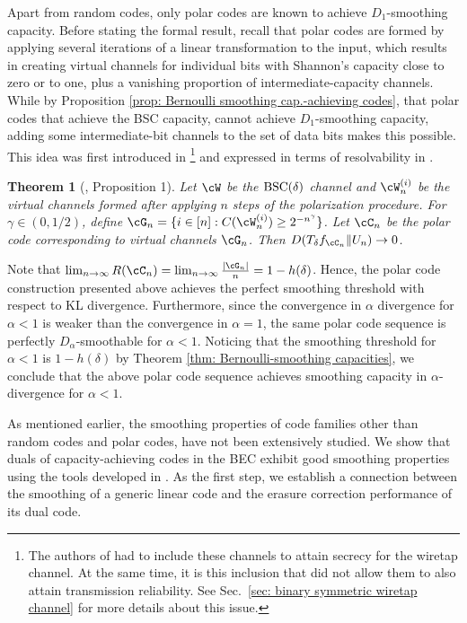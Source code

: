 \documentclass{amsart}
\newtheorem{theorem}{Theorem}[section]
\theoremstyle{remark}
\begin{document}
Apart from random codes, only polar codes are known to achieve $D_1$-smoothing capacity. Before stating the formal result, recall that polar codes are formed by applying several iterations of a linear transformation to the input, which results in creating virtual channels for individual bits with Shannon's capacity close to zero or to one, plus a vanishing proportion of intermediate-capacity channels. While by Proposition \ref{prop: Bernoulli smoothing cap.-achieving codes}, that polar codes that achieve the BSC capacity, cannot achieve $D_1$-smoothing capacity, adding some intermediate-bit channels to the 
set of data bits makes this possible. This idea was first introduced in \cite{mahdavifar2011achieving}\footnote{
\label{fn:MV} The authors of \cite{mahdavifar2011achieving} had to include these channels to attain secrecy for the wiretap channel. At the same time, it is this inclusion that did not allow them to also attain transmission reliability. See Sec.~\ref{sec: binary symmetric wiretap  channel} for more details about this issue.} and expressed in terms of resolvability in \cite{bloch2012strong}.

\begin{theorem} [\cite{bloch2012strong}, Proposition 1]\label{thm: Bernoulli smoothing polar codes}
Let $\cW$ be the ${\text{\rm BSC}}(\delta)$ channel and $\cW_n^{(i)}$  be the virtual channels formed after applying $n$ steps of the polarization procedure. 
For $\gamma \in (0,1/2)$, define $\cG_n = \{i \in [n]: C(\cW_n^{(i)}) \geq 2^{-n^\gamma}\}$. Let $\cC_n$ be the polar code corresponding to virtual channels $\cG_n$. Then $D(T_{\delta}f_{\cC_n}\|U_n) \to 0$.
\end{theorem}

 Note that $\lim_{n\to\infty}R(\cC_n) =  \lim_{n\to\infty}\frac{|\cG_n|}{n} = 1-h(\delta)$. Hence, the polar code construction presented above achieves the perfect smoothing threshold with respect to KL divergence. Furthermore, since the convergence in $\alpha$ divergence for $\alpha<1$ is weaker than the convergence in $\alpha =1$, the same polar code sequence is perfectly $D_{\alpha}$-smoothable for $\alpha<1$. Noticing that the smoothing threshold for $\alpha<1$ is $1-h(\delta)$ by Theorem \ref{thm: Bernoulli-smoothing capacities},  we conclude that the above polar code sequence achieves smoothing capacity in $\alpha$-divergence for $\alpha<1$.  

As mentioned earlier, the smoothing properties of code families other than random codes and polar codes, have not been extensively studied.  We show that duals of capacity-achieving codes in the BEC exhibit good smoothing properties using the tools developed in \cite{samorodnitsky2020improved}. As the first step, we establish a connection between the smoothing of a generic linear code and the erasure correction performance of its dual code.
\end{document}
